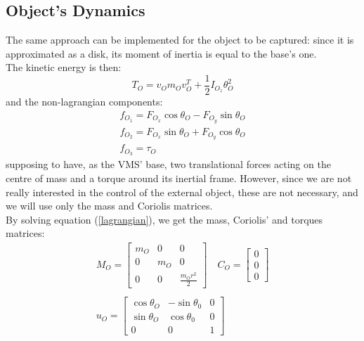 \documentclass[a4paper,12pt,oneside]{report}
\begin{document}
\subsection{Object's Dynamics}\label{object_dynamics}
The same approach can be implemented for the object to be captured: since it is approximated as a disk, its moment of inertia is equal to the base's one.\\
The kinetic energy is then:
\begin{equation}
  T_O=v_Om_Ov_O^T+\frac{1}{2}I_{O_z}\theta_O^2
\end{equation}
and the non-lagrangian components:
\begin{equation}
  \begin{array}{l}
  f_{O_1}=F_{O_x}\cos{\theta_O}-F_{O_y}\sin{\theta_O}\\
  f_{O_2}=F_{O_x}\sin{\theta_O}+F_{O_y}\cos{\theta_O}\\
  f_{O_3}=\tau_O
  \end{array}
\end{equation}
supposing to have, as the VMS' base, two translational forces acting on the centre of mass and a torque around its inertial frame. However, since we are not really interested in the control of the external object, these are not necessary, and we will use only the mass and Coriolis matrices.\\
By solving equation (\ref{lagrangian}), we get the mass, Coriolis' and torques matrices:
\begin{equation}
  \begin{array}{c}
    M_O=\begin{bmatrix}
      m_O&0&0\\
      0&m_O&0\\
      0&0&\frac{m_Or^2}{2}
    \end{bmatrix}\quad
    C_O=\begin{bmatrix}
      0\\0\\0
    \end{bmatrix}\\
    \\
    u_O=\begin{bmatrix}
      \cos{\theta_O}&-\sin{\theta_0}&0\\
      \sin{\theta_O}&\cos{\theta_0}&0\\
      0&0&1
    \end{bmatrix}
  \end{array}
  \label{object_matrices}
\end{equation}
\newpage
\end{document}
